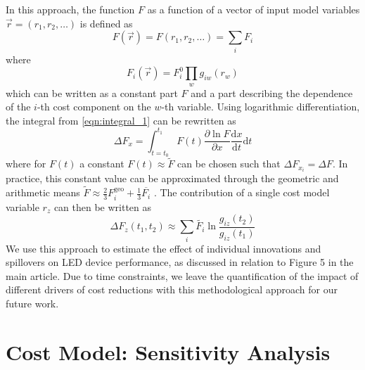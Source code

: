 \documentclass[parskip=full]{article}
\begin{document}
In this approach, the function $F$ as a function of a vector of input model variables $\vec{r}=(r_1,r_2,\dots)$ is defined as
%
\begin{equation}
    F(\vec{r}) = F(r_1,r_2, \dots) = \sum_i F_i
\end{equation}
where
\begin{equation}
    F_i(\vec{r}) = F_i^0 \prod_w g_{iw}(r_w)
\end{equation}
%
which can be written as a constant part $F$ and a part describing the dependence of the $i$-th cost component on the $w$-th variable.
%
Using logarithmic differentiation, the integral from  \cref{eqn:integral_1} can be rewritten as
\begin{equation}
    \Delta F_x = \int_{t=t_0}^{t_1} F(t) \frac{ \partial \ln F }{ \partial x } \frac{ \text{d} x }{ \text{d} t} \text{d} t
\end{equation}
%
where for $F(t)$ a constant $F(t) \approx \tilde{F} $ can be chosen such that $\Delta F_{x_i} = \Delta F$. In practice, this constant value can be approximated through the geometric and arithmetic means $\tilde{F} \approx \frac{2}{3} F_i^\text{geo} + \frac{1}{3} \overline{F_i}$ \cite{kavlak2018evaluating}. The contribution of a single cost model variable $r_z$ can then be written as
%
\begin{equation}
    \Delta F_z (t_1,t_2) \approx \sum_i \tilde{F_i} \ln \frac{g_{iz}(t_2)}{g_{iz}(t_1)}
\end{equation}
%
We use this approach to estimate the effect of individual innovations and spillovers on LED device performance, as discussed in relation to Figure 5 in the main article. Due to time constraints, we leave the quantification of the impact of different drivers of cost reductions with this methodological approach for our future work.

\newpage
\section{Cost Model: Sensitivity Analysis}
\end{document}
